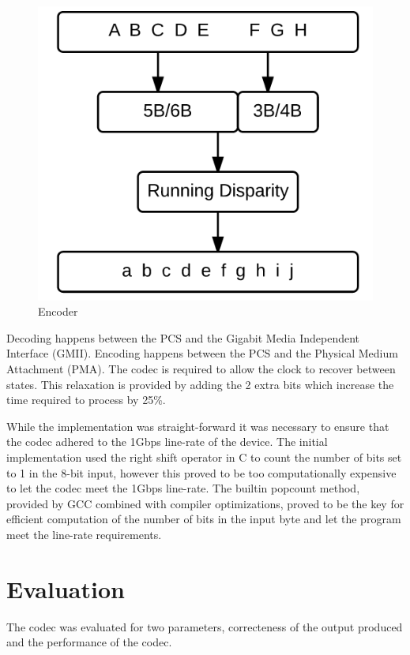 \documentclass[conference]{IEEEtran}
\begin{document}
\begin{figure}[h!]
  \centering
  \includegraphics[scale=0.50]{encoder}
  \caption{Encoder}
  \label{fig:encoder}
\end{figure}

Decoding happens between the PCS and the Gigabit Media Independent Interface (GMII). Encoding happens between the PCS and the Physical Medium  Attachment (PMA). The codec is required to allow the clock to recover between states. This relaxation is provided by adding the 2 extra bits which increase the time required to process by 25\%.

While the implementation was straight-forward it was necessary to ensure that the codec adhered to the 1Gbps line-rate of the device. The initial implementation used the right shift operator in C to count the number of bits set to 1 in the 8-bit input, however this proved to be too computationally expensive to let the codec meet the 1Gbps line-rate. The builtin popcount method, provided by GCC combined with compiler optimizations, proved to be the key for efficient computation of the number of bits in the input byte and let the program meet the line-rate requirements.

\section{Evaluation}

The codec was evaluated for two parameters, correcteness of the output produced and the performance of the codec.
\end{document}
